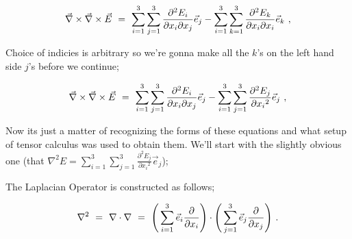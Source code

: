 \documentclass{article}
\begin{document}
\begin{equation} \label{eb-eq-51-41}
\vec{\nabla}\times\vec{\nabla}\times\vec{E} \hspace{0.125cm} = \hspace{0.125cm} \sum_{i=1}^{3} \sum_{j=1}^{3} \frac{\partial^{2}{E_i}}{\partial{x_i}\partial{x_j}} \vec{e}_j - \sum_{i=1}^{3} \sum_{k=1}^{3} \frac{\partial^{2}{E_k}}{\partial{x_i}\partial{x_i}} \vec{e}_k \hspace{0.125cm} ,
\end{equation}

Choice of indicies is arbitrary so we're gonna make all the \begin{math} k \end{math}'s on the left hand side \begin{math} j \end{math}'s before we continue;

\begin{equation} \label{eb-eq-51-42}
\vec{\nabla}\times\vec{\nabla}\times\vec{E} \hspace{0.125cm} = \hspace{0.125cm} \sum_{i=1}^{3} \sum_{j=1}^{3} \frac{\partial^{2}{E_i}}{\partial{x_i}\partial{x_j}} \vec{e}_j - \sum_{i=1}^{3} \sum_{j=1}^{3} \frac{\partial^{2}{E_j}}{\partial{x_i}^{2}} \vec{e}_j \hspace{0.125cm} ,
\end{equation}

Now its just a matter of recognizing the forms of these equations and what setup of tensor calculus was used to obtain them. We'll start with the slightly obvious one (that \begin{math} \nabla^{2} E = \sum_{i=1}^{3} \sum_{j=1}^{3} \frac{\partial^{2}{E_j}}{\partial{x_i}^{2}} \vec{e}_j \end{math});

The Laplacian Operator is constructed as follows;

\begin{equation} \label{eb-eq-51-43}
\nabla^{2} \hspace{0.125cm} = \hspace{0.125cm} \nabla\cdot\nabla \hspace{0.125cm} = \hspace{0.125cm} \Bigg( \sum_{i=1}^{3} \vec{e}_i \frac{\partial}{\partial{x_i}} \Bigg)\cdot\Bigg( \sum_{j=1}^{3} \vec{e}_j \frac{\partial}{\partial{x_j}} \Bigg) \hspace{0.125cm} .
\end{equation}
\end{document}
